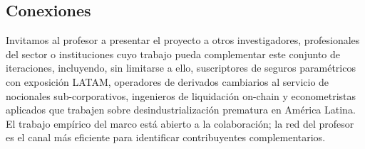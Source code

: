 \documentclass[11pt,a4paper]{article}
\theoremstyle{plain}
\begin{document}
\subsection{Conexiones}\label{sec:4-connections}

Invitamos al profesor a presentar el proyecto a otros investigadores, profesionales del sector o instituciones cuyo trabajo pueda complementar este conjunto de iteraciones, incluyendo, sin limitarse a ello, suscriptores de seguros paramétricos con exposición LATAM, operadores de derivados cambiarios al servicio de nocionales sub-corporativos, ingenieros de liquidación on-chain y econometristas aplicados que trabajen sobre desindustrialización prematura en América Latina. El trabajo empírico del marco está abierto a la colaboración; la red del profesor es el canal más eficiente para identificar contribuyentes complementarios.


\end{document}
